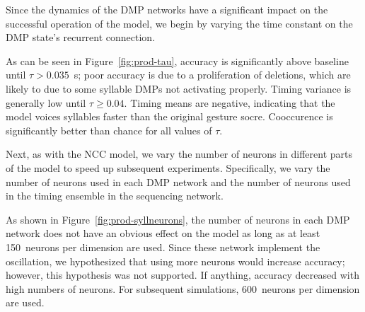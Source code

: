 Since the dynamics of the DMP networks
have a significant impact
on the successful operation of the model,
we begin by varying
the time constant on
the DMP state's recurrent connection.


As can be seen in Figure~\ref{fig:prod-tau},
accuracy is significantly above baseline
until $\tau > 0.035$~s;
poor accuracy is due to a proliferation
of deletions,
which are likely to due to some syllable DMPs
not activating properly.
Timing variance is generally low
until $\tau \ge 0.04$.
Timing means are negative,
indicating that the model
voices syllables faster
than the original gesture socre.
Cooccurence is significantly
better than chance for all values of $\tau$.

Next, as with the NCC model,
we vary the number of neurons
in different parts of the model
to speed up subsequent experiments.
Specifically, we vary the number of neurons
used in each DMP network and
the number of neurons used in the
timing ensemble in the sequencing network.


As shown in Figure~\ref{fig:prod-syllneurons},
the number of neurons in each DMP network
does not have an obvious effect
on the model as long as at least
150~neurons per dimension are used.
Since these network implement
the oscillation, we hypothesized
that using more neurons would
increase accuracy;
however, this hypothesis was not supported.
If anything, accuracy decreased with
high numbers of neurons.
For subsequent simulations,
600~neurons per dimension are used.

